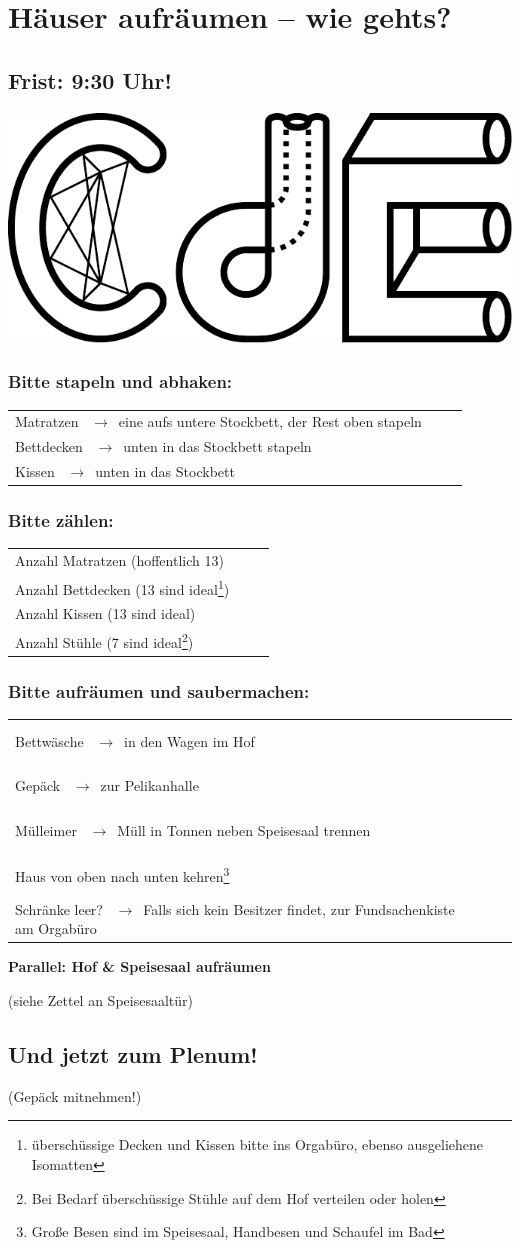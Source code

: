 \documentclass[14pt,parskip=full+]{scrartcl}
\newcommand{\checkfield}{~ \hfill ~\raisebox{-5pt}{\tikz\node[draw,minimum width=16.8pt,minimum height=16.8pt]{};}}
\newcommand{\countfield}{~ \hfill ~\raisebox{-5pt}{\tikz\node[draw,minimum width=33.6pt,minimum height=16.8pt]{};}}
\newcommand{\pfeil}{~\ensuremath{\rightarrow}~}
\newcommand{\mysection}[1]{\vspace{-.7\baselineskip}\subsubsection*{#1} \vspace{-.7\baselineskip}}
\begin{document}
\parbox[t]{.8\textwidth}{\vskip0pt
\section*{Häuser aufräumen -- wie gehts?}
\subsection*{Frist: 9:30 Uhr!}
}
\parbox[t]{.2\textwidth}{\vskip0pt 
\includegraphics[width=.18\textwidth]{pa24_logo.pdf}%
}

\bigskip

\def\arraystretch{1.3}

\mysection{Bitte stapeln und abhaken:}
\begin{tabularx}{\textwidth}{Xc}
Matratzen \pfeil eine aufs untere Stockbett, der Rest oben stapeln & \checkfield \\
Bettdecken \pfeil unten in das Stockbett stapeln & \checkfield \\
Kissen \pfeil unten in das Stockbett & \checkfield
\end{tabularx}


\mysection{Bitte zählen:}
\begin{tabularx}{\textwidth}{Xc}
Anzahl Matratzen (hoffentlich 13) & \countfield \\
Anzahl Bettdecken (13 sind ideal\footnote{überschüssige Decken und Kissen bitte ins Orgabüro, ebenso ausgeliehene Isomatten}) & \countfield \\
Anzahl Kissen (13 sind ideal\footnotemark[2]) & \countfield \\
Anzahl Stühle (7 sind ideal\footnote{Bei Bedarf überschüssige Stühle auf dem Hof verteilen oder holen}) & \countfield
\end{tabularx}

\mysection{Bitte aufräumen und saubermachen:}
\begin{tabularx}{\textwidth}{Xc}
Bettwäsche \pfeil in den Wagen im Hof & \checkfield \\
Gepäck \pfeil zur Pelikanhalle & \checkfield \\
Mülleimer \pfeil Müll in Tonnen neben Speisesaal trennen & \checkfield \\
Haus von oben nach unten kehren\footnote{Große Besen sind im Speisesaal, Handbesen und Schaufel im Bad} & \checkfield \\
Schränke leer? \pfeil Falls sich kein Besitzer findet, zur Fundsachenkiste am Orgabüro & \checkfield
\end{tabularx}
 
\textbf{Parallel: Hof \& Speisesaal aufräumen}

(siehe Zettel an Speisesaaltür)

\subsection*{Und jetzt zum Plenum!}
\vspace{-\baselineskip}
(Gepäck mitnehmen!)
\end{document}
